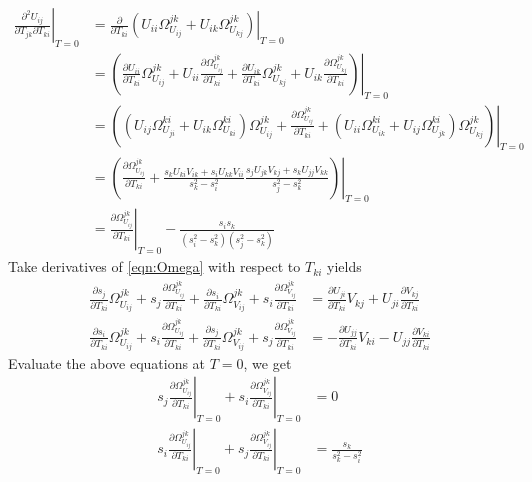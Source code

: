 \documentclass[10pt]{article}
\begin{document}
\begin{align}
	\left. \frac{\partial^2 U_{ij}}{\partial T_{jk} \partial T_{ki}} \right|_{T=0} &= \left. \frac{\partial}{\partial T_{ki}} \left( U_{ii}\Omega_{U_{ij}}^{jk} + U_{ik}\Omega_{U_{kj}}^{jk} \right) \right|_{T=0} \nonumber \\
	&= \left.\left( \frac{\partial U_{ii}}{\partial T_{ki}}\Omega_{U_{ij}}^{jk} + U_{ii}\frac{\partial \Omega_{U_{ij}}^{jk}}{\partial T_{ki}} + \frac{\partial U_{ik}}{\partial T_{ki}}\Omega_{U_{kj}}^{jk} + U_{ik}\frac{\partial \Omega_{U_{kj}}^{jk}}{\partial T_{ki}} \right)\right|_{T=0} \nonumber \\
	&= \left.\left( \left( U_{ij}\Omega_{U_{ji}}^{ki} + U_{ik}\Omega_{U_{ki}}^{ki} \right)\Omega_{U_{ij}}^{jk} + \frac{\partial \Omega_{U_{ij}}^{jk}}{\partial T_{ki}} + \left( U_{ii}\Omega_{U_{ik}}^{ki} + U_{ij}\Omega_{U_{jk}}^{ki} \right)\Omega_{U_{kj}}^{jk} \right)\right|_{T=0} \nonumber \\
	&= \left.\left( \frac{\partial \Omega_{U_{ij}}^{jk}}{\partial T_{ki}} + \frac{s_kU_{ki}V_{ik}+s_iU_{kk}V_{ii}}{s_k^2-s_i^2} \frac{s_jU_{jk}V_{kj}+s_kU_{jj}V_{kk}}{s_j^2-s_k^2} \right)\right|_{T=0} \nonumber \\
	&= \left. \frac{\partial \Omega_{U_{ij}}^{jk}}{\partial T_{ki}} \right|_{T=0} - \frac{s_is_k}{(s_i^2-s_k^2)(s_j^2-s_k^2)}
\end{align}
Take derivatives of \eqref{eqn:Omega} with respect to $T_{ki}$ yields
\begin{align}
	\frac{\partial s_j}{\partial T_{ki}}\Omega_{U_{ij}}^{jk} + s_j\frac{\partial \Omega_{U_{ij}}^{jk}}{\partial T_{ki}} + \frac{\partial s_i}{\partial T_{ki}}\Omega_{V_{ij}}^{jk} + s_i\frac{\partial \Omega_{V_{ij}}^{jk}}{\partial T_{ki}} &= \frac{\partial U_{ji}}{\partial T_{ki}}V_{kj} + U_{ji}\frac{\partial V_{kj}}{\partial T_{ki}} \nonumber \\
	\frac{\partial s_i}{\partial T_{ki}}\Omega_{U_{ij}}^{jk} + s_i\frac{\partial \Omega_{U_{ij}}^{jk}}{\partial T_{ki}} + \frac{\partial s_j}{\partial T_{ki}}\Omega_{V_{ij}}^{jk} + s_j\frac{\partial \Omega_{V_{ij}}^{jk}}{\partial T_{ki}} &= -\frac{\partial U_{jj}}{\partial T_{ki}}V_{ki} - U_{jj}\frac{\partial V_{ki}}{\partial T_{ki}}
\end{align}
Evaluate the above equations at $T=0$, we get
\begin{align}
	\left. s_j\frac{\partial \Omega_{U_{ij}}^{jk}}{\partial T_{ki}} \right|_{T=0} + \left. s_i\frac{\partial \Omega_{V_{ij}}^{jk}}{\partial T_{ki}} \right|_{T=0} &= 0 \nonumber \\
	\left. s_i\frac{\partial \Omega_{U_{ij}}^{jk}}{\partial T_{ki}} \right|_{T=0} + \left. s_j\frac{\partial \Omega_{V_{ij}}^{jk}}{\partial T_{ki}} \right|_{T=0} &= \frac{s_k}{s_k^2-s_i^2}
\end{align}
\end{document}
